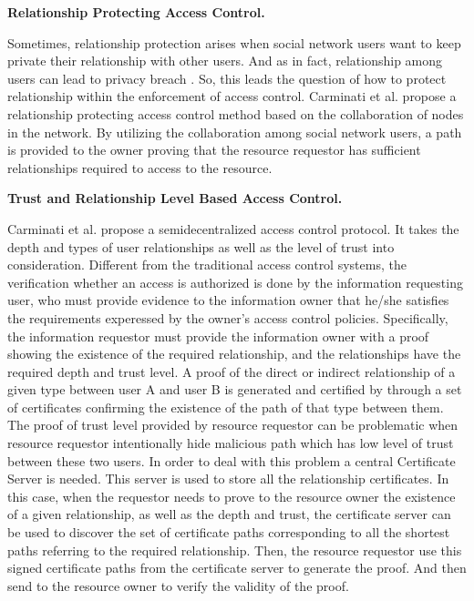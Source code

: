 \documentclass[12pt]{article}
\begin{document}
\textbf{Relationship Protecting Access Control.}

Sometimes, relationship protection arises when social network users
want to keep private their relationship with other users. And as in fact,
relationship among users can lead to privacy 
breach\cite{private-relationship} \cite{SN-private-relation}. So, this
leads the question of how to protect relationship within the
enforcement of access control. Carminati et al.\cite{crypto-collaborative-ac}
propose a relationship protecting access control method based on the
collaboration of nodes in the network. By utilizing the collaboration
among social network users, a path is provided to the owner
proving that the resource requestor has sufficient relationships
required to access to the resource. 

\textbf{Trust and Relationship Level Based Access Control.}

Carminati et al. \cite{enforce-access-control} propose a
semidecentralized access control protocol. It takes the
depth and types of user relationships as well as the level of trust
into consideration. Different from the traditional access control
systems, the verification whether an access is authorized
is done by the information requesting user, who must provide evidence
to the information owner that he/she satisfies the requirements
experessed by the owner's access control policies. Specifically, the
information requestor must provide the information owner with a proof
showing the existence of the required relationship, and the
relationships have the required depth and trust level. A proof of the
direct or indirect relationship of a given type between user A and
user B is generated and certified by through a set of certificates
confirming the existence of the path of that type between them. The
proof of trust level provided by resource requestor can be problematic
when resource requestor intentionally hide malicious path which has
low level of trust between these two users. In order to deal with this
problem a central Certificate Server is needed. This server is used to
store all the relationship certificates. In this case, when the
requestor needs to prove to the resource owner the existence of a
given relationship, as well as the depth and trust, the certificate
server can be used to discover the set of certificate paths
corresponding to all the shortest paths referring to the required
relationship. Then, the resource requestor use this signed certificate
paths from the certificate server to generate the proof. And then send
to the resource owner to verify the validity of the proof. 
\end{document}
